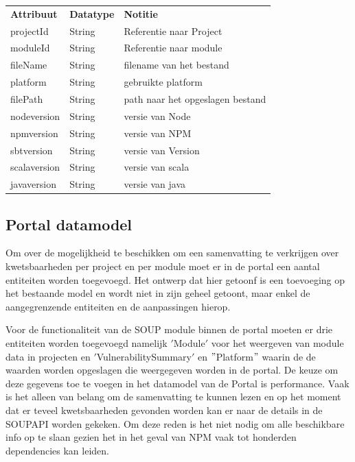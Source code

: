 \begin{tabular}{lll}
    \textbf{Attribuut} & \textbf{Datatype} & \textbf{Notitie}\\
    projectId & String & Referentie naar Project\\
    moduleId & String & Referentie naar module \\
    fileName & String & filename van het bestand \\
    platform & String & gebruikte platform \\
    filePath & String & path naar het opgeslagen bestand \\
    nodeversion & String & versie van Node  \\
    npmversion & String & versie van NPM  \\
    sbtversion & String & versie van Version  \\
    scalaversion & String & versie van scala  \\
    javaversion & String & versie van java \\
\end{tabular}

\subsection{Portal datamodel}\label{subsec:portal-datamodel}
Om over de mogelijkheid te beschikken om een samenvatting te verkrijgen over kwetsbaarheden per project en per module moet er in de portal een aantal entiteiten worden toegevoegd. Het ontwerp dat hier getoonf is een toevoeging op het bestaande model en wordt niet in zijn geheel getoont, maar enkel de aangegrenzende entiteiten en de aanpassingen hierop.

Voor de functionaliteit van de SOUP module binnen de portal moeten er drie entiteiten worden toegevoegd namelijk $'$Module$'$ voor het weergeven van module data in projecten en $'$VulnerabilitySummary$'$  en $"$Platform$"$ waarin de de waarden worden opgeslagen die weergegeven worden in de portal. De keuze om deze gegevens toe te voegen in het datamodel van de Portal is performance. Vaak is het alleen van belang om de samenvatting te kunnen lezen en op het moment dat er teveel kwetsbaarheden gevonden worden kan er naar de details in de SOUPAPI worden gekeken. Om deze reden is het niet nodig om alle beschikbare info op te slaan gezien het in het geval van NPM vaak tot honderden dependencies kan leiden.


